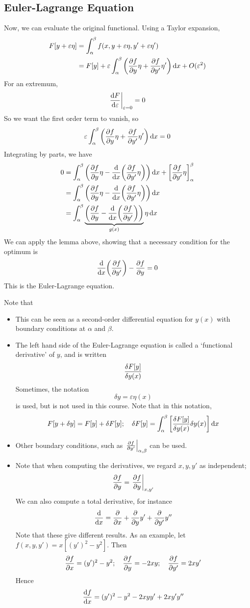 \subsection{Euler-Lagrange Equation}
Now, we can evaluate the original functional.
Using a Taylor expansion,
\begin{align*}
	F[y + \varepsilon \eta] & = \int_\alpha^\beta f(x, y+\varepsilon\eta, y'+\varepsilon\eta')                                        \\
	                        & = F[y] + \varepsilon\int_\alpha^\beta \qty(\pdv{f}{y}\eta + \pdv{f}{y'}\eta') \dd{x} + O(\varepsilon^2)
\end{align*}
For an extremum,
\[
	\eval{\dv{F}{\varepsilon}}_{\varepsilon = 0} = 0
\]
So we want the first order term to vanish, so
\[
	\varepsilon\int_\alpha^\beta \qty(\pdv{f}{y}\eta + \pdv{f}{y'}\eta') \dd{x} = 0
\]
Integrating by parts, we have
\begin{align*}
	0 & = \int_\alpha^\beta \qty(\pdv{f}{y}\eta - \dv{x} \qty(\pdv{f}{y'}\eta)) \dd{x} + \qty[\pdv{f}{y'}\eta]_\alpha^\beta \\
	  & = \int_\alpha^\beta \qty(\pdv{f}{y}\eta - \dv{x} \qty(\pdv{f}{y'}\eta)) \dd{x}                                      \\
	  & = \int_\alpha^\beta \underbrace{\qty(\pdv{f}{y} - \dv{x} \qty(\pdv{f}{y'}))}_{g(x)} \eta \dd{x}
\end{align*}
We can apply the lemma above, showing that a necessary condition for the optimum is
\[
	\dv{x} \qty(\pdv{f}{y'}) - \pdv{f}{y} = 0
\]
This is the Euler-Lagrange equation.
\begin{remark}
	Note that
	\begin{itemize}
		\item This can be seen as a second-order differential equation for \(y(x)\) with boundary conditions at \(\alpha\) and \(\beta\).
		\item The left hand side of the Euler-Lagrange equation is called a `functional derivative' of \(y\), and is written
		      \[
			      \fdv{F[y]}{y(x)}
		      \]
		      Sometimes, the notation
		      \[
			      \delta y = \varepsilon\eta(x)
		      \]
		      is used, but is not used in this course.
		      Note that in this notation,
		      \[
			      F[y + \delta y] = F[y] + \delta F[y];\quad \delta F[y] = \int_\alpha^\beta \qty[\fdv{F[y]}{y(x)} \delta y(x)]\dd{x}
		      \]
		\item Other boundary conditions, such as \(\eval{\pdv{f}{y'}}_{\alpha, \beta}\) can be used.
		\item Note that when computing the derivatives, we regard \(x, y, y'\) as independent;
		      \[
			      \pdv{f}{y} = \eval{\pdv{f}{y}}_{x, y'}
		      \]
		      We can also compute a total derivative, for instance
		      \[
			      \dv{x} = \pdv{x} + \pdv{y}y' + \pdv{y'}y''
		      \]
		      Note that these give different results.
		      As an example, let \(f(x, y, y') = x[(y')^2 - y^2]\).
		      Then
		      \[
			      \pdv{f}{x} = (y')^2 - y^2;\quad \pdv{f}{y} = -2xy;\quad \pdv{f}{y'} = 2xy'
		      \]
		      Hence
		      \[
			      \dv{f}{x} = (y')^2 - y^2 - 2xyy' + 2xy'y''
		      \]
	\end{itemize}
\end{remark}

